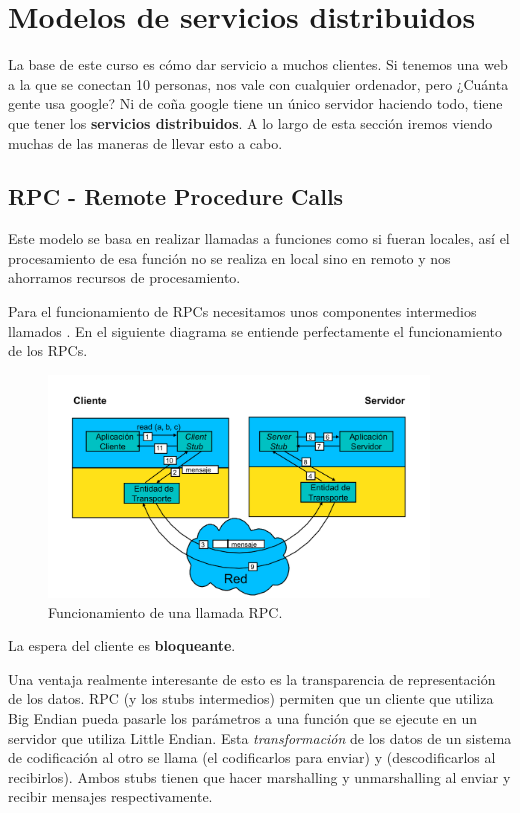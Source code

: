 \section{Modelos de servicios distribuidos}

La base de este curso es cómo dar servicio a muchos clientes. Si tenemos una web a la que se conectan 10 personas, nos vale con cualquier ordenador, pero ¿Cuánta gente usa google? Ni de coña google tiene un único servidor haciendo todo, tiene que tener los \textbf{servicios distribuidos}. A lo largo de esta sección iremos viendo muchas de las maneras de llevar esto a cabo.

\subsection{RPC - Remote Procedure Calls}
Este modelo se basa en realizar llamadas a funciones como si fueran locales, así el procesamiento de esa función no se realiza en local sino en remoto y nos ahorramos recursos de procesamiento.

Para el funcionamiento de RPCs necesitamos unos componentes intermedios llamados . En el siguiente diagrama se entiende perfectamente el funcionamiento de los RPCs.
\begin{figure}[htb]
\centering
\includegraphics[width=0.9\textwidth]{img/RPC.png}
\caption{Funcionamiento de una llamada RPC.}
\label{RPCimg}
\end{figure}
\newpage

\obs La espera del cliente es \textbf{bloqueante}.

\obs Una ventaja realmente interesante de esto es la transparencia de representación de los datos. RPC (y los stubs intermedios) permiten que un cliente que utiliza Big Endian pueda pasarle los parámetros a una función que se ejecute en un servidor que utiliza Little Endian. Esta \textit{transformación} de los datos de un sistema de codificación al otro se llama  (el codificarlos para enviar) y  (descodificarlos al recibirlos). Ambos stubs tienen que hacer marshalling y unmarshalling al enviar y recibir mensajes respectivamente.

